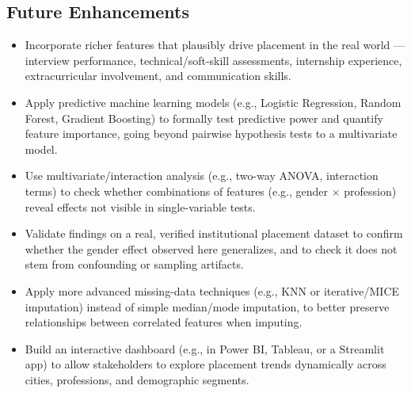 \documentclass[11pt]{article}
\begin{document}
\subsection*{Future Enhancements}
\begin{itemize}[leftmargin=1.2cm]
    \item Incorporate richer features that plausibly drive placement in the real world --- interview performance, technical/soft-skill assessments, internship experience, extracurricular involvement, and communication skills.
    \item Apply predictive machine learning models (e.g., Logistic Regression, Random Forest, Gradient Boosting) to formally test predictive power and quantify feature importance, going beyond pairwise hypothesis tests to a multivariate model.
    \item Use multivariate/interaction analysis (e.g., two-way ANOVA, interaction terms) to check whether combinations of features (e.g., gender $\times$ profession) reveal effects not visible in single-variable tests.
    \item Validate findings on a real, verified institutional placement dataset to confirm whether the gender effect observed here generalizes, and to check it does not stem from confounding or sampling artifacts.
    \item Apply more advanced missing-data techniques (e.g., KNN or iterative/MICE imputation) instead of simple median/mode imputation, to better preserve relationships between correlated features when imputing.
    \item Build an interactive dashboard (e.g., in Power BI, Tableau, or a Streamlit app) to allow stakeholders to explore placement trends dynamically across cities, professions, and demographic segments.
\end{itemize}
\end{document}
